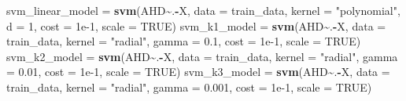 \documentclass[
]{article}
\newenvironment{Shaded}{\begin{snugshade}}{\end{snugshade}}
\newcommand{\AttributeTok}[1]{\textcolor[rgb]{0.13,0.29,0.53}{#1}}
\newcommand{\ConstantTok}[1]{\textcolor[rgb]{0.56,0.35,0.01}{#1}}
\newcommand{\DecValTok}[1]{\textcolor[rgb]{0.00,0.00,0.81}{#1}}
\newcommand{\FloatTok}[1]{\textcolor[rgb]{0.00,0.00,0.81}{#1}}
\newcommand{\FunctionTok}[1]{\textcolor[rgb]{0.13,0.29,0.53}{\textbf{#1}}}
\newcommand{\NormalTok}[1]{#1}
\newcommand{\OtherTok}[1]{\textcolor[rgb]{0.56,0.35,0.01}{#1}}
\newcommand{\SpecialCharTok}[1]{\textcolor[rgb]{0.81,0.36,0.00}{\textbf{#1}}}
\newcommand{\StringTok}[1]{\textcolor[rgb]{0.31,0.60,0.02}{#1}}
\begin{document}
\begin{Shaded}
\begin{Highlighting}[]
\NormalTok{svm\_linear\_model }\OtherTok{=} \FunctionTok{svm}\NormalTok{(AHD}\SpecialCharTok{\textasciitilde{}}\NormalTok{.}\SpecialCharTok{{-}}\NormalTok{X, }\AttributeTok{data =}\NormalTok{ train\_data, }\AttributeTok{kernel =} \StringTok{"polynomial"}\NormalTok{, }\AttributeTok{d =} \DecValTok{1}\NormalTok{, }\AttributeTok{cost =} \FloatTok{1e{-}1}\NormalTok{, }\AttributeTok{scale =} \ConstantTok{TRUE}\NormalTok{)}
\NormalTok{svm\_k1\_model }\OtherTok{=} \FunctionTok{svm}\NormalTok{(AHD}\SpecialCharTok{\textasciitilde{}}\NormalTok{.}\SpecialCharTok{{-}}\NormalTok{X, }\AttributeTok{data =}\NormalTok{ train\_data, }\AttributeTok{kernel =} \StringTok{"radial"}\NormalTok{, }\AttributeTok{gamma =} \FloatTok{0.1}\NormalTok{, }\AttributeTok{cost =} \FloatTok{1e{-}1}\NormalTok{, }\AttributeTok{scale =} \ConstantTok{TRUE}\NormalTok{)}
\NormalTok{svm\_k2\_model }\OtherTok{=} \FunctionTok{svm}\NormalTok{(AHD}\SpecialCharTok{\textasciitilde{}}\NormalTok{.}\SpecialCharTok{{-}}\NormalTok{X, }\AttributeTok{data =}\NormalTok{ train\_data, }\AttributeTok{kernel =} \StringTok{"radial"}\NormalTok{, }\AttributeTok{gamma =} \FloatTok{0.01}\NormalTok{, }\AttributeTok{cost =} \FloatTok{1e{-}1}\NormalTok{, }\AttributeTok{scale =} \ConstantTok{TRUE}\NormalTok{)}
\NormalTok{svm\_k3\_model }\OtherTok{=} \FunctionTok{svm}\NormalTok{(AHD}\SpecialCharTok{\textasciitilde{}}\NormalTok{.}\SpecialCharTok{{-}}\NormalTok{X, }\AttributeTok{data =}\NormalTok{ train\_data, }\AttributeTok{kernel =} \StringTok{"radial"}\NormalTok{, }\AttributeTok{gamma =} \FloatTok{0.001}\NormalTok{, }\AttributeTok{cost =} \FloatTok{1e{-}1}\NormalTok{, }\AttributeTok{scale =} \ConstantTok{TRUE}\NormalTok{)}
\end{Highlighting}
\end{Shaded}
\end{document}
